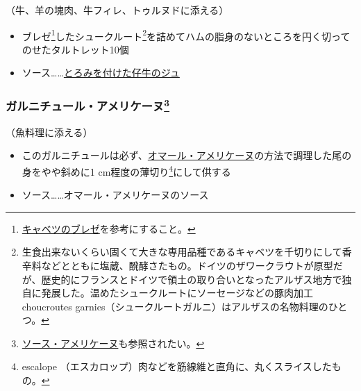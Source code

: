 \begin{recette}


（牛、羊の塊肉、牛フィレ、トゥルヌドに添える）

\begin{itemize}
\item
  ブレゼ\footnote{\protect\hyperlink{chou-braise}{キャベツのブレゼ}を参考にすること。}したシュークルート\footnote{生食出来ないくらい固くて大きな専用品種であるキャベツを千切りにして香辛料などとともに塩蔵、醗酵さたもの。ドイツのザワークラウトが原型だが、歴史的にフランスとドイツで領土の取り合いとなったアルザス地方で独自に発展した。温めたシュークルートにソーセージなどの豚肉加工
    choucroutes
    garnies（シュークルートガルニ）はアルザスの名物料理のひとつ。}を詰めてハムの脂身のないところを円く切ってのせたタルトレット10個
\item
  ソース\ldots{}\ldots{}\protect\hyperlink{jus-de-veau-lie}{とろみを付けた仔牛のジュ}
\end{itemize}

\hypertarget{garniture-americaine}{%
\subsubsection[ガルニチュール・アメリケーヌ]{\texorpdfstring{ガルニチュール・アメリケーヌ\footnote{\protect\hyperlink{sauce-americaine}{ソース・アメリケーヌ}も参照されたい。}}{ガルニチュール・アメリケーヌ}}\label{garniture-americaine}}



（魚料理に添える）

\begin{itemize}
\item
  このガルニチュールは必ず、\protect\hyperlink{homard-americaine}{オマール・アメリケーヌ}の方法で調理した尾の身をやや斜めに1
  cm程度の薄切り\footnote{escalope
    （エスカロップ）肉などを筋線維と直角に、丸くスライスしたもの。}にして供する
\item
  ソース\ldots{}\ldots{}オマール・アメリケーヌのソース
\end{itemize}


\end{recette}
